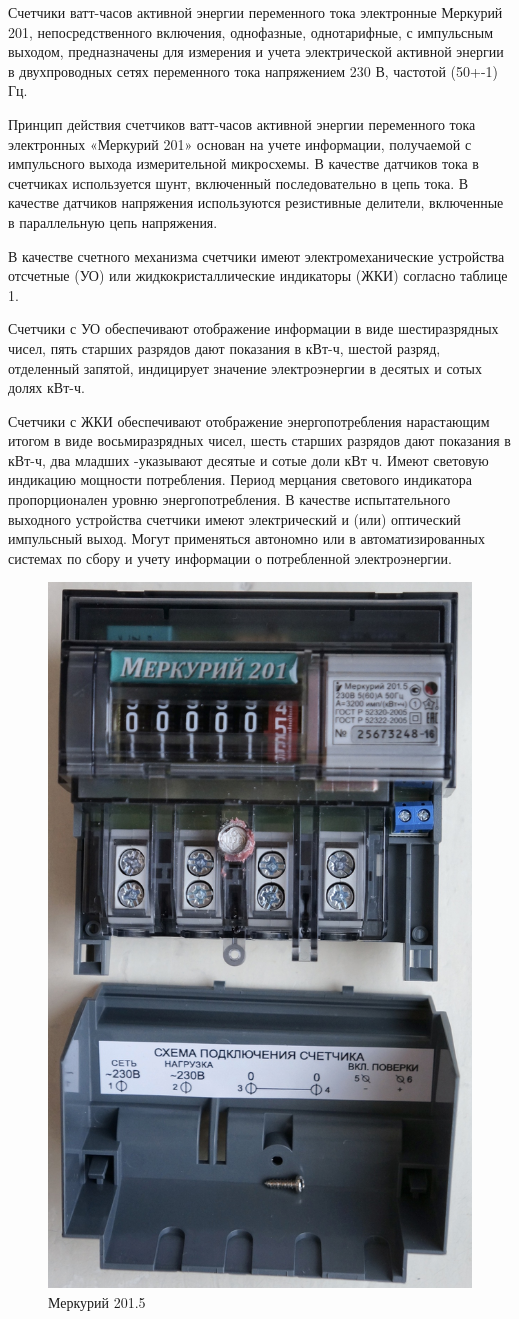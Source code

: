 Счетчики ватт-часов активной энергии переменного тока электронные Меркурий 201, непосредственного включения, однофазные, однотарифные, с импульсным выходом, предназначены для измерения и учета электрической активной энергии в двухпроводных сетях переменного тока напряжением 230 В, частотой (50+-1) Гц.

Принцип действия счетчиков ватт-часов активной энергии переменного тока электронных «Меркурий 201» основан на учете информации, получаемой с импульсного выхода измерительной микросхемы. В качестве датчиков тока в счетчиках используется шунт, включенный последовательно в цепь тока. В качестве датчиков напряжения используются резистивные делители, включенные в параллельную цепь напряжения. \cite{incotexcom}

В качестве счетного механизма счетчики имеют электромеханические устройства отсчетные (УО) или жидкокристаллические индикаторы (ЖКИ) согласно таблице 1.

Счетчики с УО обеспечивают отображение информации в виде шестиразрядных чисел, пять старших разрядов дают показания в кВт-ч, шестой разряд, отделенный запятой, индицирует значение электроэнергии в десятых и сотых долях кВт-ч.

Счетчики с ЖКИ обеспечивают отображение энергопотребления нарастающим итогом в виде восьмиразрядных чисел, шесть старших разрядов дают показания в кВт-ч, два младших -указывают десятые и сотые доли кВт ч. Имеют световую индикацию мощности потребления. Период мерцания светового индикатора пропорционален уровню энергопотребления. В качестве испытательного выходного устройства счетчики имеют электрический и (или) оптический импульсный выход. Могут применяться автономно или в автоматизированных системах по сбору и учету информации о потребленной электроэнергии.  

\begin{figure}[H]
	\centering
	\includegraphics[width=0.5\linewidth]{pics/mercuriy}
	\caption{Меркурий 201.5}
	\label{fig:mercuriy}
\end{figure}